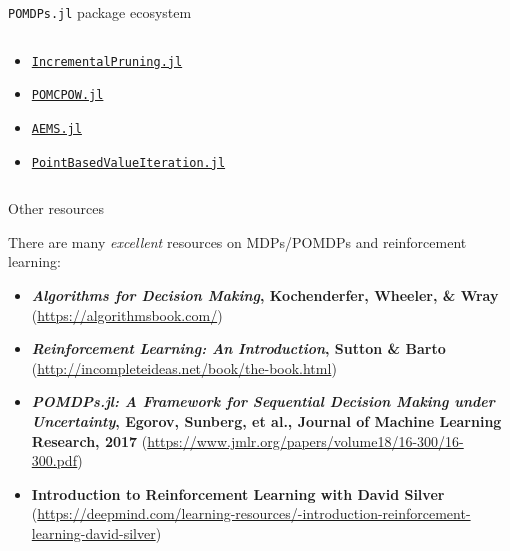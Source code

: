 \begin{frame}[fragile]{\texttt{POMDPs.jl} package ecosystem}
\begin{columns}[T,onlytextwidth]
\begin{column}{0.32\linewidth}
{\begin{itemize}
            \item {\color{julia_purple}\href{https://github.com/JuliaPOMDP/IncrementalPruning.jl}{\texttt{IncrementalPruning.jl}}}
            \item {\color{julia_purple}\href{https://github.com/JuliaPOMDP/POMCPOW.jl}{\texttt{POMCPOW.jl}}}
            \item {\color{julia_purple}\href{https://github.com/JuliaPOMDP/AEMS.jl}{\texttt{AEMS.jl}}}
            \item {\color{julia_purple}\href{https://github.com/JuliaPOMDP/PointBasedValueIteration.jl}{\texttt{PointBasedValueIteration.jl}}}
        \end{itemize}
        }
    \end{column}
\end{columns}


\end{frame}


\begin{frame}[fragile]{Other resources}

There are many \textit{excellent} resources on MDPs/POMDPs and reinforcement learning:

{\scriptsize
\begin{itemize}
    \item \textbf{\textit{Algorithms for Decision Making}, Kochenderfer, Wheeler, \& Wray} ({\color{julia_blue}\url{https://algorithmsbook.com/}})
    \item \textbf{\textit{Reinforcement Learning: An Introduction}, Sutton \& Barto} ({\color{julia_blue}\url{http://incompleteideas.net/book/the-book.html}})
    \item \textbf{\textit{POMDPs.jl: A Framework for Sequential Decision Making under Uncertainty}, Egorov, Sunberg, et al., Journal of Machine Learning Research, 2017} ({\color{julia_blue}\url{https://www.jmlr.org/papers/volume18/16-300/16-300.pdf}})
    \item \textbf{Introduction to Reinforcement Learning with David Silver} ({\color{julia_blue}\url{https://deepmind.com/learning-resources/-introduction-reinforcement-learning-david-silver}})
\end{itemize}
}

\end{frame}

